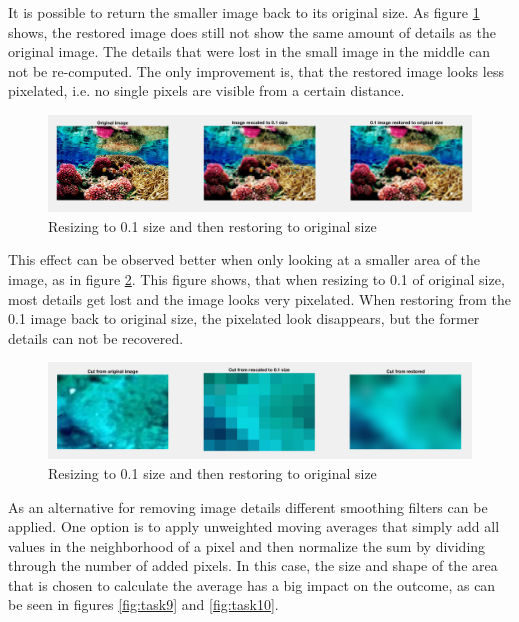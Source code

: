 It is possible to return the smaller image back to its original size. As figure \ref{fig:task7} shows, the restored image does still not show the same amount of details as the original image. The details that were lost in the small image in the middle can not be re-computed. The only improvement is, that the restored image looks less pixelated, i.e. no single pixels are visible from a certain distance.   

\begin{figure}[!hbt]
  \includegraphics[width=\textwidth]{./img/task7.png}
  \caption{Resizing to 0.1 size and then restoring to original size}
  \label{fig:task7}
\end{figure}

This effect can be observed better when only looking at a smaller area of the image, as in figure \ref{fig:task8}. This figure shows, that when resizing to 0.1 of original size, most details get lost and the image looks very pixelated. When restoring from the 0.1 image back to original size, the pixelated look disappears, but the former details can not be recovered.

\begin{figure}[!hbt]
  \includegraphics[width=\textwidth]{./img/task8.png}
  \caption{Resizing to 0.1 size and then restoring to original size}
  \label{fig:task8}
\end{figure}

As an alternative for removing image details different smoothing filters can be applied. One option is to apply unweighted moving averages that simply add all values in the neighborhood of a pixel and then normalize the sum by dividing through the number of added pixels. In this case, the size and shape of the area that is chosen to calculate the average has a big impact on the outcome, as can be seen in figures \ref{fig:task9} and \ref{fig:task10}.

